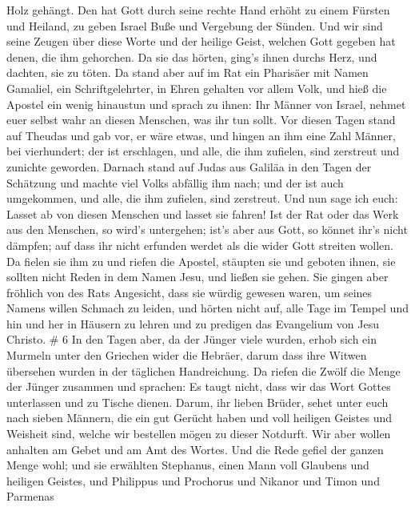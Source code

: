 Holz gehängt.  Den hat Gott durch seine rechte Hand erhöht
zu einem Fürsten und Heiland, zu geben Israel Buße und Vergebung der
Sünden.  Und wir sind seine Zeugen über diese Worte und der
heilige Geist, welchen Gott gegeben hat denen, die ihm gehorchen.
 Da sie das hörten, ging's ihnen durchs Herz, und dachten,
sie zu töten.  Da stand aber auf im Rat ein Pharisäer mit
Namen Gamaliel, ein Schriftgelehrter, in Ehren gehalten vor allem Volk,
und hieß die Apostel ein wenig hinaustun  und sprach zu
ihnen: Ihr Männer von Israel, nehmet euer selbst wahr an diesen
Menschen, was ihr tun sollt.  Vor diesen Tagen stand auf
Theudas und gab vor, er wäre etwas, und hingen an ihm eine Zahl Männer,
bei vierhundert; der ist erschlagen, und alle, die ihm zufielen, sind
zerstreut und zunichte geworden.  Darnach stand auf Judas
aus Galiläa in den Tagen der Schätzung und machte viel Volks abfällig
ihm nach; und der ist auch umgekommen, und alle, die ihm zufielen, sind
zerstreut.  Und nun sage ich euch: Lasset ab von diesen
Menschen und lasset sie fahren! Ist der Rat oder das Werk aus den
Menschen, so wird's untergehen;  ist's aber aus Gott, so
könnet ihr's nicht dämpfen; auf dass ihr nicht erfunden werdet als die
wider Gott streiten wollen.  Da fielen sie ihm zu und
riefen die Apostel, stäupten sie und geboten ihnen, sie sollten nicht
Reden in dem Namen Jesu, und ließen sie gehen.  Sie gingen
aber fröhlich von des Rats Angesicht, dass sie würdig gewesen waren, um
seines Namens willen Schmach zu leiden,  und hörten nicht
auf, alle Tage im Tempel und hin und her in Häusern zu lehren und zu
predigen das Evangelium von Jesu Christo. \# 6  In den Tagen
aber, da der Jünger viele wurden, erhob sich ein Murmeln unter den
Griechen wider die Hebräer, darum dass ihre Witwen übersehen wurden in
der täglichen Handreichung.  Da riefen die Zwölf die Menge
der Jünger zusammen und sprachen: Es taugt nicht, dass wir das Wort
Gottes unterlassen und zu Tische dienen.  Darum, ihr lieben
Brüder, sehet unter euch nach sieben Männern, die ein gut Gerücht haben
und voll heiligen Geistes und Weisheit sind, welche wir bestellen mögen
zu dieser Notdurft.  Wir aber wollen anhalten am Gebet und
am Amt des Wortes.  Und die Rede gefiel der ganzen Menge
wohl; und sie erwählten Stephanus, einen Mann voll Glaubens und heiligen
Geistes, und Philippus und Prochorus und Nikanor und Timon und Parmenas
